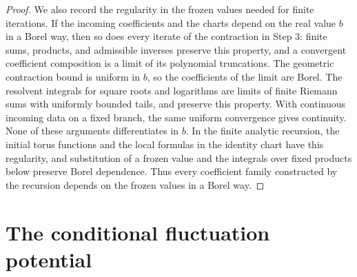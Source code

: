 \begin{proof}
We also record the regularity in the frozen values needed for finite iterations. If the incoming coefficients and the charts depend on the real value $b$ in a Borel way, then so does every iterate of the contraction in Step 3: finite sums, products, and admissible inverses preserve this property, and a convergent coefficient composition is a limit of its polynomial truncations. The geometric contraction bound is uniform in $b$, so the coefficients of the limit are Borel. The resolvent integrals for square roots and logarithms are limits of finite Riemann sums with uniformly bounded tails, and preserve this property. With continuous incoming data on a fixed branch, the same uniform convergence gives continuity. None of these arguments differentiates in $b$. In the finite analytic recursion, the initial torus functions and the local formulas in the identity chart have this regularity, and substitution of a frozen value and the integrals over fixed products below preserve Borel dependence. Thus every coefficient family constructed by the recursion depends on the frozen values in a Borel way.
\end{proof}

\section{The conditional fluctuation potential}\label{ch17:sec:potential}

